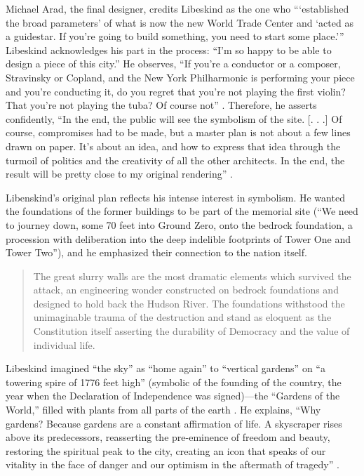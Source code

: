 Michael Arad, the final designer, credits Libeskind as
the one who “‘established the broad parameters’ of what is now the new
World Trade Center and ‘acted as a guidestar.  If
you're going to build something,
you need to start some place.’”  Libeskind acknowledges his part in the
process: ``I'm so happy to be able to
design a piece of this city.''  He observes,
``If you're a conductor or a composer,
Stravinsky or Copland, and the New York Philharmonic is performing your
piece and you're conducting it, do you regret that
you're not playing the first violin?  That
you're not playing the tuba?  Of course not'' \citep{huffpost2012}.
Therefore, he
asserts confidently, “In the end, the public will see the symbolism of
the site.  [. . .] Of course, compromises had to be made, but a master
plan is not about a few lines drawn on paper.  It’s about an idea, and
how to express that idea through the turmoil of politics and the
creativity of all the other architects.  In the end, the result will be
pretty close to my original rendering” \citep{davidson2007}.

Libenskind’s
original plan reflects his intense interest in symbolism.  He wanted
the foundations of the former buildings to be part of the memorial site
(“We need to journey down, some 70 feet into Ground Zero, onto the
bedrock foundation, a procession with deliberation into the deep
indelible footprints of Tower One and Tower Two”),
and he emphasized
their connection to the nation itself. 

\begin{quote}
The great slurry walls are the most dramatic elements which survived the
attack, an engineering wonder constructed on bedrock foundations and
designed to hold back the Hudson River.  The foundations withstood the
unimaginable trauma of the destruction and stand as eloquent as the
Constitution itself asserting the durability of Democracy and the value
of individual life. \citep{libeskind2012}
\end{quote}

Libeskind imagined “the sky” as “home again” to “vertical gardens” on “a
towering spire of 1776 feet high” (symbolic of the founding of the
country, the year when the Declaration of Independence was signed)—the
“Gardens of the World,” filled with plants from all parts of the earth
 \citep{libeskind2012, ny1news2003, nessen2011}.
He explains, “Why gardens?  Because gardens are a constant affirmation of
life.  A skyscraper rises above its predecessors, reasserting the
pre-eminence of freedom and beauty, restoring the spiritual peak to the
city, creating an icon that speaks of our vitality in the face of
danger and our optimism in the aftermath of tragedy” \citep{libeskind2012}.

